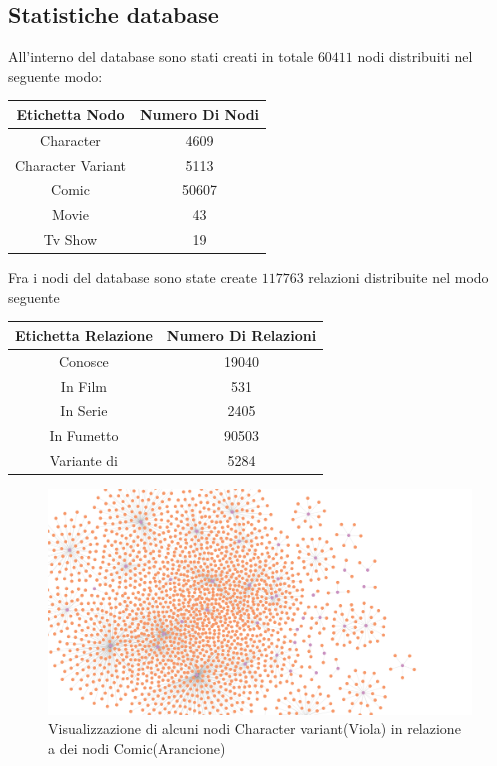 \documentclass[
12pt, %
a4paper, %
oneside, %
headinclude,footinclude, %
BCOR5mm, %
]{scrartcl}
\begin{document}
\subsection{Statistiche database}
All'interno del database sono stati creati in totale $60411$ nodi distribuiti nel seguente modo: 

\begin{center}
\begin{tabular}{||c c||} 
 \hline
 Etichetta Nodo  & Numero Di Nodi \\ [0.5ex] 
 \hline\hline
	
	Character & 4609 \\ \hline 
	Character Variant & 5113 \\ \hline
	Comic & 50607 \\ \hline
	Movie & 43 \\ \hline
	Tv Show & 19 \\ [0.5ex] \hline 
\end{tabular}
\end{center}
Fra i nodi del database sono state create $117763$ relazioni distribuite nel modo seguente
\begin{center}
\begin{tabular}{||c c||} 
 \hline
 Etichetta Relazione  & Numero Di Relazioni \\ [0.5ex] 
 \hline\hline
	Conosce & 19040 \\ \hline 
	In Film & 531 \\ \hline
	In Serie & 2405 \\ \hline
	In Fumetto & 90503 \\ \hline
	Variante di & 5284 \\ [0.5ex] \hline 
\end{tabular}
\end{center}
\begin{figure}[H]
  \includegraphics[scale=0.27]{./Figures/comic-variant.png}
  \caption{Visualizzazione di alcuni nodi Character variant(Viola) in relazione a dei nodi Comic(Arancione)}
\end{figure}
\end{document}
